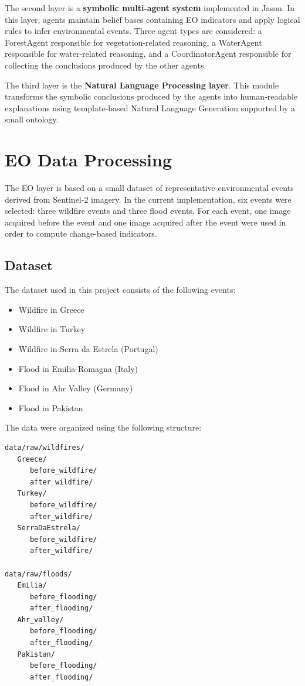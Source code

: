 \documentclass[11pt,a4paper]{article}
\begin{document}
The second layer is a \textbf{symbolic multi-agent system} implemented in Jason. In this layer, agents maintain belief bases containing EO indicators and apply logical rules to infer environmental events. Three agent types are considered: a ForestAgent responsible for vegetation-related reasoning, a WaterAgent responsible for water-related reasoning, and a CoordinatorAgent responsible for collecting the conclusions produced by the other agents.

The third layer is the \textbf{Natural Language Processing layer}. This module transforms the symbolic conclusions produced by the agents into human-readable explanations using template-based Natural Language Generation supported by a small ontology.

\section{EO Data Processing}

The EO layer is based on a small dataset of representative environmental events derived from Sentinel-2 imagery. In the current implementation, six events were selected: three wildfire events and three flood events. For each event, one image acquired before the event and one image acquired after the event were used in order to compute change-based indicators.

\subsection{Dataset}

The dataset used in this project consists of the following events:

\begin{itemize}
\item Wildfire in Greece
\item Wildfire in Turkey
\item Wildfire in Serra da Estrela (Portugal)
\item Flood in Emilia-Romagna (Italy)
\item Flood in Ahr Valley (Germany)
\item Flood in Pakistan
\end{itemize}

The data were organized using the following structure:

\begin{verbatim}
data/raw/wildfires/
   Greece/
      before_wildfire/
      after_wildfire/
   Turkey/
      before_wildfire/
      after_wildfire/
   SerraDaEstrela/
      before_wildfire/
      after_wildfire/

data/raw/floods/
   Emilia/
      before_flooding/
      after_flooding/
   Ahr_valley/
      before_flooding/
      after_flooding/
   Pakistan/
      before_flooding/
      after_flooding/
\end{verbatim}
\end{document}
